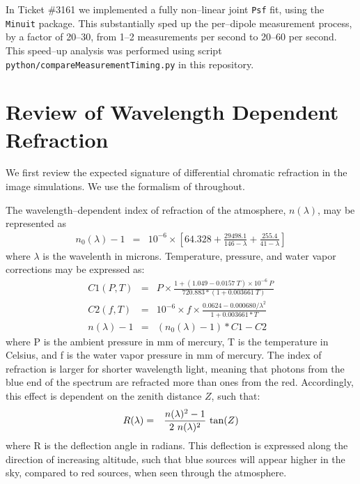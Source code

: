 \documentclass[prd, nofootinbib, floatfix, 11pt, tightenlines, times]{article}
\begin{document}
In Ticket \#3161 we implemented a fully non--linear joint {\tt Psf}
fit, using the {\tt Minuit} package.  This substantially sped up the
per--dipole measurement process, by a factor of 20--30, from 1--2
measurements per second to 20--60 per second.  This speed--up analysis
was performed using script {\tt python/compareMeasurementTiming.py} in
this repository.

\section{Review of Wavelength Dependent Refraction \label{sec:theory}}

We first review the expected signature of differential chromatic
refraction in the image simulations.  We use the formalism of
\cite{1982PASP...94..715F} throughout.

The wavelength--dependent index of refraction of the atmosphere,
$n(\lambda)$, may be represented as
\begin{eqnarray}
\label{eqn:dcr0}
n_0(\lambda) - 1 & = & 10^{-6} \times \left[ 64.328 + \frac{29498.1}{146 - \lambda} + \frac{255.4}{41 - \lambda} \right]
\end{eqnarray}
where $\lambda$ is the wavelenth in microns.  Temperature, pressure,
and water vapor corrections may be expressed as:
\begin{eqnarray}
\label{eqn:dcr}
C1(P,T) & = & P \times \frac{1 + (1.049 - 0.0157~T) \times 10^{-6}~P}{720.883 * (1 + 0.003661~T)} \\
C2(f,T) & = & 10^{-6} \times f \times \frac{0.0624 - 0.000680/\lambda^2}{1 + 0.003661 * T} \\
n(\lambda) - 1 & = & (n_0(\lambda) - 1) * C1 - C2 
\end{eqnarray}
where P is the ambient pressure in mm of mercury, T is the temperature
in Celsius, and f is the water vapor pressure in mm of mercury.  The
index of refraction is larger for shorter wavelength light, meaning
that photons from the blue end of the spectrum are refracted more than
ones from the red.  Accordingly, this effect is dependent on the
zenith distance $Z$, such that:
\begin{eqnarray}
R(\lambda) & = & \frac{n(\lambda)^2 - 1}{2~n(\lambda)^2}~{\rm tan}(Z)
\end{eqnarray}
where R is the deflection angle in radians.  This deflection is
expressed along the direction of increasing altitude, such that blue
sources will appear higher in the sky, compared to red sources, when
seen through the atmosphere.
\end{document}
